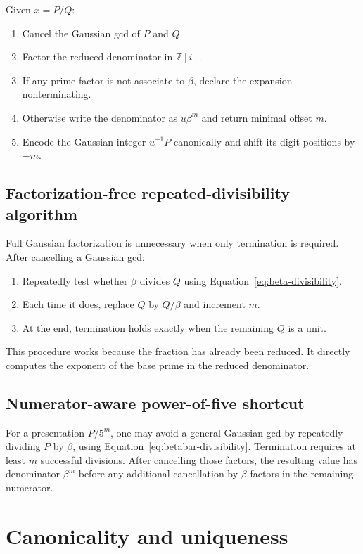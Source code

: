 \documentclass[11pt]{article}
\theoremstyle{definition}
\newcommand{\Zi}{\mathbb{Z}[i]}
\begin{document}
Given $x=P/Q$:
\begin{enumerate}
\item Cancel the Gaussian gcd of $P$ and $Q$.
\item Factor the reduced denominator in $\Zi$.
\item If any prime factor is not associate to $\beta$, declare the expansion nonterminating.
\item Otherwise write the denominator as $u\beta^m$ and return minimal offset $m$.
\item Encode the Gaussian integer $u^{-1}P$ canonically and shift its digit positions by $-m$.
\end{enumerate}

\subsection{Factorization-free repeated-divisibility algorithm}

Full Gaussian factorization is unnecessary when only termination is required.  After cancelling a Gaussian gcd:
\begin{enumerate}
\item Repeatedly test whether $\beta$ divides $Q$ using Equation~\eqref{eq:beta-divisibility}.
\item Each time it does, replace $Q$ by $Q/\beta$ and increment $m$.
\item At the end, termination holds exactly when the remaining $Q$ is a unit.
\end{enumerate}

This procedure works because the fraction has already been reduced.  It directly computes the exponent of the base prime in the reduced denominator.

\subsection{Numerator-aware power-of-five shortcut}

For a presentation $P/5^m$, one may avoid a general Gaussian gcd by repeatedly dividing $P$ by $\overline\beta$, using Equation~\eqref{eq:betabar-divisibility}.  Termination requires at least $m$ successful divisions.  After cancelling those factors, the resulting value has denominator $\beta^m$ before any additional cancellation by $\beta$ factors in the remaining numerator.

\section{Canonicality and uniqueness}
\end{document}

